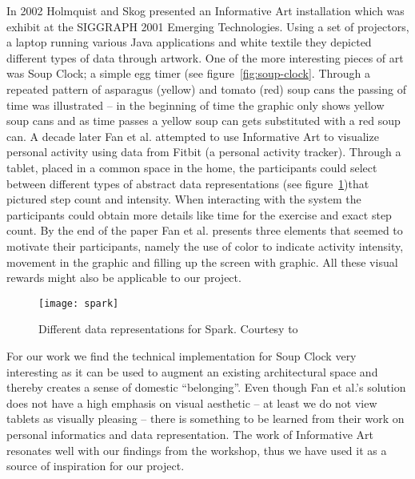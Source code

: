 In 2002 Holmquist and Skog \cite{holmquist2003informative} presented an Informative Art installation which was exhibit at the SIGGRAPH 2001 Emerging Technologies. Using a set of projectors, a laptop running various Java applications and white textile they depicted different types of data through artwork. One of the more interesting pieces of art was Soup Clock; a simple egg timer (see figure~\ref{fig:soup-clock}. Through a repeated pattern of asparagus (yellow) and tomato (red) soup cans the passing of time was illustrated -- in the beginning of time the graphic only shows yellow soup cans and as time passes a yellow soup can gets substituted with a red soup can. A decade later Fan et al. \cite{fan2012spark} attempted to use Informative Art to visualize personal activity using data from Fitbit (a personal activity tracker). Through a tablet, placed in a common space in the home, the participants could select between different types of abstract data representations (see figure~\ref{fig:spark})that pictured step count and intensity. When interacting with the system the participants could obtain more details like time for the exercise and exact step count. By the end of the paper Fan et al. presents three elements that seemed to motivate their participants, namely the use of color to indicate activity intensity, movement in the graphic and filling up the screen with graphic. All these visual rewards might also be applicable to our project.

\begin{figure}[h]
	\centering
	\texttt{[image: spark]}
	\caption{Different data representations for Spark. Courtesy to \cite{fan2012spark}}
	\label{fig:spark}
\end{figure}

For our work we find the technical implementation for Soup Clock very interesting as it can be used to augment an existing architectural space and thereby creates a sense of domestic “belonging”. Even though Fan et al.’s solution does not have a high emphasis on visual aesthetic -- at least we do not view tablets as visually pleasing -- there is something to be learned from their work on personal informatics and data representation. The work of Informative Art resonates well with our findings from the workshop, thus we have used it as a source of inspiration for our project.

